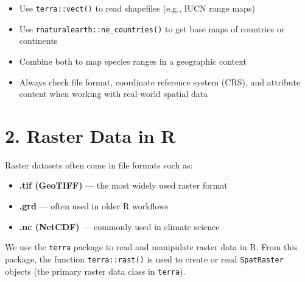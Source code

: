 \documentclass[
]{book}
\providecommand{\tightlist}{%
  \setlength{\itemsep}{0pt}\setlength{\parskip}{0pt}}
\begin{document}
\begin{tcolorbox}[enhanced jigsaw, left=2mm, bottomtitle=1mm, colframe=quarto-callout-note-color-frame, title=\textcolor{quarto-callout-note-color}{\faInfo}\hspace{0.5em}{Key spatial vector workflow skills}, breakable, coltitle=black, leftrule=.75mm, bottomrule=.15mm, arc=.35mm, toprule=.15mm, colback=white, toptitle=1mm, rightrule=.15mm, titlerule=0mm, opacityback=0, colbacktitle=quarto-callout-note-color!10!white, opacitybacktitle=0.6]

\begin{itemize}
\tightlist
\item
  Use \texttt{terra::vect()} to read shapefiles (e.g., IUCN range
  maps)\\
\item
  Use \texttt{rnaturalearth::ne\_countries()} to get base maps of
  countries or continents\\
\item
  Combine both to map species ranges in a geographic context\\
\item
  Always check file format, coordinate reference system (CRS), and
  attribute content when working with real-world spatial data\\
\end{itemize}

\end{tcolorbox}

\section{2. Raster Data in R}\label{raster-data-in-r}

Raster datasets often come in file formats such as:

\begin{itemize}
\item
  \textbf{.tif (GeoTIFF)} --- the most widely used raster format
\item
  \textbf{.grd} --- often used in older R workflows
\item
  \textbf{.nc (NetCDF)} --- commonly used in climate science
\end{itemize}

We use the \texttt{terra} package to read and manipulate raster data in
R. From this package, the function \texttt{terra::rast()} is used to
create or read \texttt{SpatRaster} objects (the primary raster data
class in \texttt{terra}).
\end{document}
